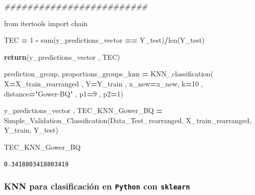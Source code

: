 \documentclass[
  11pt,
  a4paper,
]{article}
\newenvironment{Shaded}{\begin{snugshade}}{\end{snugshade}}
\newcommand{\BuiltInTok}[1]{#1}
\newcommand{\CommentTok}[1]{\textcolor[rgb]{0.56,0.35,0.01}{\textit{#1}}}
\newcommand{\ControlFlowTok}[1]{\textcolor[rgb]{0.13,0.29,0.53}{\textbf{#1}}}
\newcommand{\DecValTok}[1]{\textcolor[rgb]{0.00,0.00,0.81}{#1}}
\newcommand{\ImportTok}[1]{#1}
\newcommand{\NormalTok}[1]{#1}
\newcommand{\OperatorTok}[1]{\textcolor[rgb]{0.81,0.36,0.00}{\textbf{#1}}}
\newcommand{\StringTok}[1]{\textcolor[rgb]{0.31,0.60,0.02}{#1}}
\begin{document}
\begin{Shaded}
\begin{Highlighting}[]
    \CommentTok{\#\#\#\#\#\#\#\#\#\#\#\#\#\#\#\#\#\#\#\#\#\#\#\#\#}

    \ImportTok{from}\NormalTok{ itertools }\ImportTok{import}\NormalTok{ chain}

\NormalTok{    TEC }\OperatorTok{=} \DecValTok{1} \OperatorTok{{-}} \BuiltInTok{sum}\NormalTok{(y\_predictions\_vector }\OperatorTok{==}\NormalTok{ Y\_test)}\OperatorTok{/}\BuiltInTok{len}\NormalTok{(Y\_test)     }

 
    \ControlFlowTok{return}\NormalTok{(y\_predictions\_vector , TEC)}
\end{Highlighting}
\end{Shaded}

\begin{Shaded}
\begin{Highlighting}[]
\NormalTok{prediction\_group, proportions\_groups\_knn  }\OperatorTok{=}\NormalTok{  KNN\_classification( X}\OperatorTok{=}\NormalTok{X\_train\_rearranged , Y}\OperatorTok{=}\NormalTok{Y\_train , x\_new}\OperatorTok{=}\NormalTok{x\_new, k}\OperatorTok{=}\DecValTok{10}\NormalTok{ , distance}\OperatorTok{=}\StringTok{"Gower{-}BQ"}\NormalTok{ , p1}\OperatorTok{=}\DecValTok{9}\NormalTok{ , p2}\OperatorTok{=}\DecValTok{1}\NormalTok{)}
\end{Highlighting}
\end{Shaded}

\begin{Shaded}
\begin{Highlighting}[]
\NormalTok{y\_predictions\_vector , TEC\_KNN\_Gower\_BQ  }\OperatorTok{=}\NormalTok{ Simple\_Validation\_Classification(Data\_Test\_rearranged, X\_train\_rearranged, Y\_train, Y\_test)}
\end{Highlighting}
\end{Shaded}

\begin{Shaded}
\begin{Highlighting}[]
\NormalTok{TEC\_KNN\_Gower\_BQ}
\end{Highlighting}
\end{Shaded}

\begin{verbatim}
0.3418803418803419
\end{verbatim}

\newpage

\hypertarget{knn-para-clasificaciuxf3n-en-python-con-sklearn}{%
\subsubsection{\texorpdfstring{KNN para clasificación en \texttt{Python}
con
\texttt{sklearn}}{KNN para clasificación en Python con sklearn}}\label{knn-para-clasificaciuxf3n-en-python-con-sklearn}}
\end{document}
